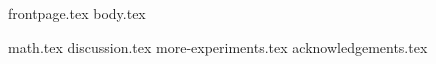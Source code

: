 \documentclass[runningheads]{llncs}
\begin{document}
{frontpage.tex}
{body.tex}

\iflncs
  
\fi
\ifoakland
  
\fi
\ifccs
  
\fi


\appendix

{math.tex}
{discussion.tex}
{more-experiments.tex}
\ifanonymous
\else
  {acknowledgements.tex}
\fi
\end{document}
